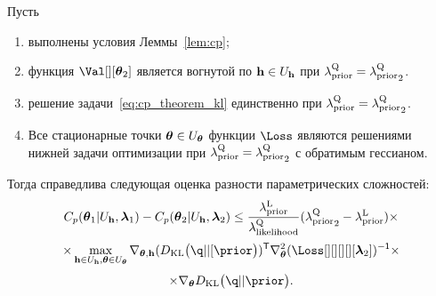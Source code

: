 \begin{theorem}
Пусть
\begin{enumerate}
\item выполнены условия Леммы~\ref{lem:cp};
\item функция $\Val[][\teta_2]$ является вогнутой по $\mathbf{h} \in U_{\mathbf{h}}$ при  $\lambda_\text{prior}^\text{Q} = {\lambda_\text{prior}^\text{Q}}_2$.
\item решение задачи~\eqref{eq:cp_theorem_kl}  единственно при  $\lambda_\text{prior}^\text{Q} = {\lambda_\text{prior}^\text{Q}}_2$.
\item Все стационарные точки $\boldsymbol{\theta} \in U_{\boldsymbol{\theta}}$  функции $\Loss$ являются решениями нижней задачи оптимизации при  $\lambda_\text{prior}^\text{Q} = {\lambda_\text{prior}^\text{Q}}_2$ с обратимым гессианом.

\end{enumerate}
Тогда справедлива следующая оценка разности параметрических сложностей:
\[
    C_p(\boldsymbol{\theta}_1|U_{\mathbf{h}}, \boldsymbol{\lambda}_1) - C_p(\boldsymbol{\theta}_2|U_{\mathbf{h}}, \boldsymbol{\lambda}_2)  \leq \frac{\lambda_\text{prior}^\text{L} }{\lambda_\text{likelihood}^\text{Q}} ({\lambda_\text{prior}^\text{Q}}_2 - \lambda_\text{prior}^\text{L}) \times  
\]
\[
 \times \max_{\h \in \Uh, \teta \in \Uteta}  \nabla_{\teta, \h} (\KL{\q}{[\prior})^\mathsf{T}  \nabla_{\teta}^2(\Loss[][][][][\lam_2])^\mathsf{-1} \times
\]
\[\times \nabla_{\teta} \KL{\q}{\prior}.
\]
\end{theorem}
